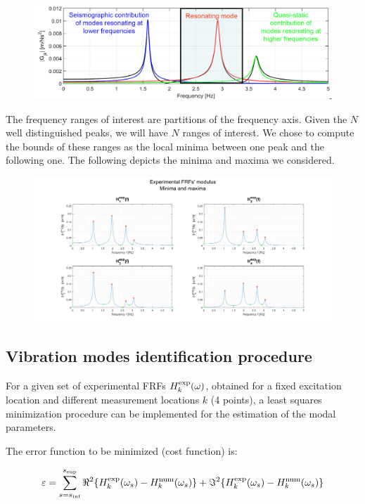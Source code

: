 \documentclass[a4paper,12pt,oneside]{article}
\begin{document}
\begin{figure}[H]
	\includegraphics[scale=0.4]{frf_num_regions}
\end{figure}

The frequency ranges of interest are partitions of the frequency axis. Given the $ N $ well distinguished peaks, we will have $ N $ ranges of interest. We chose to compute the bounds of these ranges as the local minima between one peak and the following one. The following depicts the minima and maxima we considered.

\begin{figure}[h]
	\hspace{-70pt}
	\includegraphics[scale=0.4]{experimental_frfs_modulus_min_max}
\end{figure}

\subsection*{Vibration modes identification procedure}

For a given set of experimental FRFs $ H^\textup{exp}_k(\omega) $, obtained for a fixed excitation location and different measurement locations $ k $ (4 points), a least squares minimization procedure can be implemented for the estimation of the modal parameters.

The error function to be minimized (cost function) is:

\[
	\varepsilon = \sum_{s=s_\textup{inf}}^{s_\textup{sup}}
		\Re^2\{H^\textup{exp}_k(\omega_s) - H^\textup{num}_k(\omega_s)\} +
		\Im^2\{H^\textup{exp}_k(\omega_s) - H^\textup{num}_k(\omega_s)\}
\]
\end{document}
